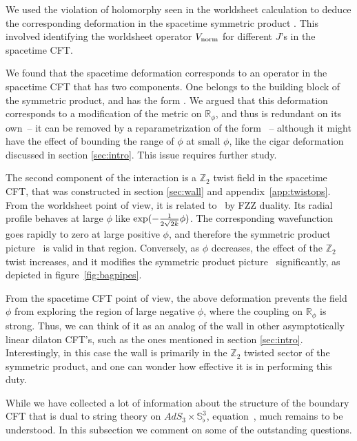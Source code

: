 \documentclass[12pt]{article}
\def\sqsphere{{\bS^3_\flat}}
\newcommand{\bR}{{\mathbb R}}
\newcommand{\bS}{{\mathbb S}}
\newcommand{\bZ}{{\mathbb Z}}
\numberwithin{equation}{section}
\def\exp{{\rm exp}}
\begin{document}
We used the violation of holomorphy seen in the worldsheet calculation to deduce the corresponding deformation in the spacetime symmetric product \ourcft. This involved identifying the worldsheet operator $V_{\rm norm}$ for different $J$'s in the spacetime CFT. 

We found that the spacetime deformation corresponds to an operator in the spacetime CFT that has two components. One belongs to the building block of the symmetric product, and has the form \Lblock. We argued that this deformation corresponds to a modification of the metric on $\bR_\phi$, and thus is redundant on its own~-- it can be removed by a reparametrization of the form \phiredef~-- although it might have the effect of bounding the range of $\phi$ at small $\phi$, like the cigar deformation discussed in section \ref{sec:intro}. This issue requires further study. 

The second component of the interaction is a $\bZ_2$ twist field in the spacetime CFT, that was constructed in section \ref{sec:wall} and appendix~\ref{app:twistops}.  From the worldsheet point of view, it is related to \Lblock\ by FZZ duality. Its radial profile behaves at large $\phi$ like $\exp(-\frac{1}{2\sqrt{2k}} \phi)$. The corresponding wavefunction goes rapidly to zero at large positive $\phi$, and therefore the symmetric product picture \ourcft\ is valid in that region. Conversely, as $\phi$ decreases, the effect of the $\bZ_2$ twist increases, and it modifies the symmetric product picture \ourcft\ significantly, as depicted in figure~\ref{fig:bagpipes}.

From the spacetime CFT point of view, the above deformation prevents the field $\phi$ from exploring the region of large negative $\phi$, where the coupling on $\bR_\phi$ is strong. Thus, we can think of it as an analog of the wall in other asymptotically linear dilaton CFT's, such as the ones mentioned in section \ref{sec:intro}. Interestingly, in this case the wall is primarily in the $\bZ_2$ twisted sector of the symmetric product, and one can wonder how effective it is in performing this duty. 


\label{sec:whatisit}

While we have collected a lot of information about the structure of the boundary CFT that is dual to string theory on $AdS_3\times\sqsphere$, equation~\ourads, much remains to be understood. In this subsection we comment on some of the outstanding questions. 
\end{document}
